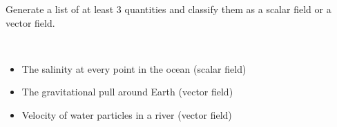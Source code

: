 Generate a list of at least 3 quantities and classify them as a scalar field or a vector field.

\begin{solution} \
\begin{itemize}
    \item The salinity at every point in the ocean (scalar field)
    \item The gravitational pull around Earth (vector field)
    \item Velocity of water particles in a river (vector field)
\end{itemize}
\end{solution}